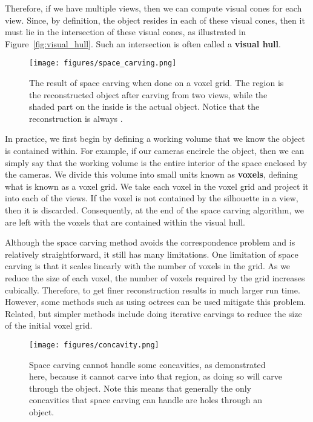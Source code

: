 \documentclass[a4paper, 12pt]{article}
\renewcommand\emph{\textbf}
\numberwithin{equation}{section}
\begin{document}
Therefore, if we have multiple views, then we can compute visual cones for each view. Since, by definition, the object resides in each of these visual cones, then it must lie in the intersection of these visual cones, as illustrated in Figure~\ref{fig:visual_hull}. Such an intersection is often called a \emph{visual hull}. 

\begin{figure}[h!]
    \centering
    \texttt{[image: figures/space\_carving.png]}
    \caption{The result of space carving when done on a voxel grid. The region is the reconstructed object after carving from two views, while the shaded part on the inside is the actual object. Notice that the reconstruction is always 
    .}
    \label{fig:space_carving}
\end{figure}

In practice, we first begin by defining a working volume that we know the object is contained within. For example, if our cameras encircle the object, then we can simply say that the working volume is the entire interior of the space enclosed by the cameras. We divide this volume into small units known as \emph{voxels}, defining what is known as a voxel grid. We take each voxel in the voxel grid and project it into each of the views. If the voxel is not contained by the silhouette in a view, then it is discarded. Consequently, at the end of the space carving algorithm, we are left with the voxels that are contained within the visual hull.

Although the space carving method avoids the correspondence problem and is relatively straightforward, it still has many limitations. One limitation of space carving is that it scales linearly with the number of voxels in the grid. As we reduce the size of each voxel, the number of voxels required by the grid increases cubically. Therefore, to get finer reconstruction results in much larger run time. However, some methods such as using octrees can be used mitigate this problem. Related, but simpler methods include doing iterative carvings to reduce the size of the initial voxel grid. 

\begin{figure}[h!]
    \centering
    \texttt{[image: figures/concavity.png]}
    \caption{Space carving cannot handle some concavities, as demonstrated here, because it cannot carve into that region, as doing so will carve through the object. Note this means that generally the only concavities that space carving can handle are holes through an object. }
    \label{fig:concavity}
\end{figure}
\end{document}

